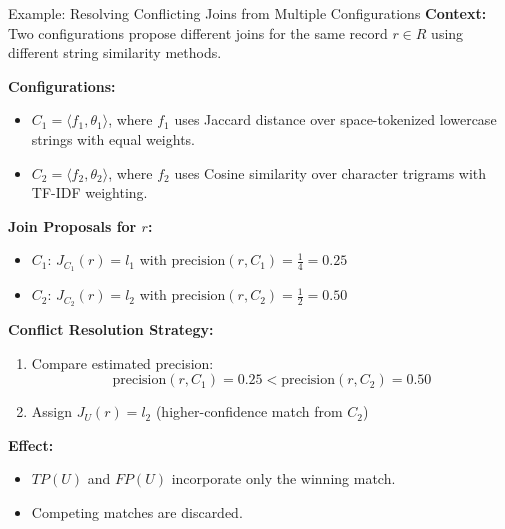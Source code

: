 \documentclass[8pt]{beamer} %
\begin{document}
\begin{frame}{Example: Resolving Conflicting Joins from Multiple Configurations}
	\textbf{Context:} Two configurations propose different joins for the same record $r \in R$ using different string similarity methods.
	
	\vspace{0.5em}
	\textbf{Configurations:}
	\begin{itemize}
		\item $C_1 = \langle f_1, \theta_1 \rangle$, where $f_1$ uses Jaccard distance over space-tokenized lowercase strings with equal weights.
		\item $C_2 = \langle f_2, \theta_2 \rangle$, where $f_2$ uses Cosine similarity over character trigrams with TF-IDF weighting.
	\end{itemize}
	
	\vspace{0.5em}
	\textbf{Join Proposals for $r$:}
	\begin{itemize}
		\item $C_1$: $J_{C_1}(r) = l_1$ with $\text{precision}(r, C_1) = \frac{1}{4} = 0.25$
		\item $C_2$: $J_{C_2}(r) = l_2$ with $\text{precision}(r, C_2) = \frac{1}{2} = 0.50$
	\end{itemize}
	
	\vspace{0.5em}
	\textbf{Conflict Resolution Strategy:}
	\begin{enumerate}
		\item Compare estimated precision:
		$$
		\text{precision}(r, C_1) = 0.25 < \text{precision}(r, C_2) = 0.50
		$$
		\item Assign $J_U(r) = l_2$ (higher-confidence match from $C_2$)
	\end{enumerate}
	
	\vspace{0.5em}
	\textbf{Effect:}
	\begin{itemize}
		\item $TP(U)$ and $FP(U)$ incorporate only the winning match.
		\item Competing matches are discarded.
	\end{itemize}
\end{frame}
\end{document}
